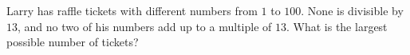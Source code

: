 Larry has raffle tickets with different numbers from $1$ to $100$. None is divisible by $13$, and no two of his numbers add up to a multiple of $13$. What is the largest possible number of tickets?
